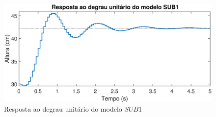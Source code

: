 \begin{figure}[htb]
	\centering
	\includegraphics[width=1\linewidth]{respostadegrausub1}
	\caption[Resposta ao degrau do modelo $SUB1$]{Resposta ao degrau unitário do modelo $SUB1$}
	\label{fig:respostadegrausub}
\end{figure}



